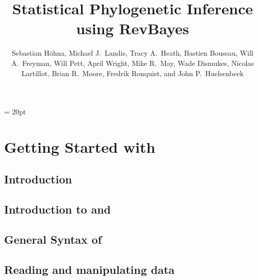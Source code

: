 \documentclass[11pt]{book}
\begin{document}
\renewcommand{\headrulewidth}{0.5pt}
\headsep = 20pt
\lhead{ }


\frontmatter

\title{\Huge \textbf{Statistical Phylogenetic Inference using RevBayes} }
\author{
Sebastian H{\"o}hna,
Michael J.~Landis,
Tracy A.~Heath,
Bastien Boussau,
Will A.~Freyman,
Will Pett,
April Wright,
Mike R.~May,
Wade Dismukes,
Nicolas Lartillot,
Brian R.~Moore,
Fredrik Ronquist, and
John P.~Huelsenbeck
}


\maketitle

\tableofcontents




\mainmatter

\def \GlobalResourcePath {./}

\part{Getting Started with \RevBayes}

\chapter{Introduction}
\def \ResourcePath {RB_Getting_Started/}


\chapter{Introduction to \RevBayes and \Rev}
\def \ResourcePath {RB_Intro_Tutorial/}


\chapter{General Syntax of \Rev}
\def \ResourcePath {RB_Rev_Tutorial/}


\chapter{Reading and manipulating data}
\def \ResourcePath {RB_Data_Tutorial/}

\end{document}
